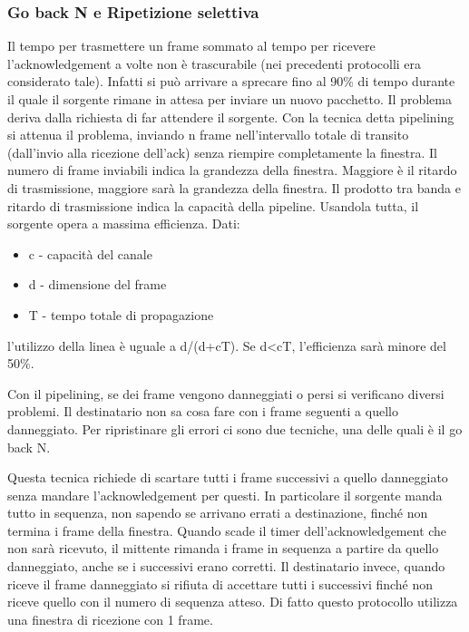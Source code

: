 \subsubsection{Go back N e Ripetizione selettiva}
Il tempo per trasmettere un frame sommato al tempo per ricevere l'acknowledgement a volte non è trascurabile (nei precedenti protocolli era considerato tale).
Infatti si può arrivare a sprecare fino al 90\% di tempo durante il quale il sorgente rimane in attesa per inviare un nuovo pacchetto.
Il problema deriva dalla richiesta di far attendere il sorgente.
Con la tecnica detta pipelining si attenua il problema, 
inviando n frame nell'intervallo totale di transito (dall'invio alla ricezione dell'ack) senza riempire completamente la finestra.
Il numero di frame inviabili indica la grandezza della finestra.
Maggiore è il ritardo di trasmissione, maggiore sarà la grandezza della finestra.
Il prodotto tra banda e ritardo di trasmissione indica la capacità della pipeline.
Usandola tutta, il sorgente opera a massima efficienza.
Dati: 
\begin{itemize}
    \item c - capacità del canale
    \item d - dimensione del frame
    \item T - tempo totale di propagazione
\end{itemize}
l'utilizzo della linea è uguale a d/(d+cT).
Se d<cT, l'efficienza sarà minore del 50\%.

Con il pipelining, se dei frame vengono danneggiati o persi si verificano diversi problemi.
Il destinatario non sa cosa fare con i frame seguenti a quello danneggiato.
Per ripristinare gli errori ci sono due tecniche, una delle quali è il go back N.

Questa tecnica richiede di scartare tutti i frame successivi a quello danneggiato senza mandare l'acknowledgement per questi.
In particolare il sorgente manda tutto in sequenza, non sapendo se arrivano errati a destinazione, finché non termina i frame della finestra.
Quando scade il timer dell'acknowledgement che non sarà ricevuto, il mittente rimanda i frame in sequenza a partire da quello danneggiato,
anche se i successivi erano corretti.
Il destinatario invece, quando riceve il frame danneggiato si rifiuta di accettare tutti i successivi finché non riceve quello con il numero di sequenza atteso.
Di fatto questo protocollo utilizza una finestra di ricezione con 1 frame.


